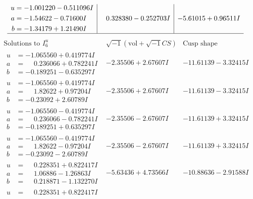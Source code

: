 \documentclass[1p]{elsarticle_modified}
\theoremstyle{definition}
\newcommand{\I}{\sqrt{-1}}
\begin{document}
$$\begin{array}{c|c|c}
\begin{aligned}
u &= -1.001220 - 0.511096 I \\
a &= -1.54622 - 0.71600 I \\
b &= -1.34179 + 1.21490 I\end{aligned}
 & \phantom{-}0.328380 - 0.252703 I & -5.61015 + 0.96511 I\\
 \hline 
 \end{array}$$\newpage$$\begin{array}{c|c|c}  
\text{Solutions to }I^u_{6}& \I (\text{vol} + \sqrt{-1}CS) & \text{Cusp shape}\\
 \hline 
\begin{aligned}
u &= -1.065560 + 0.419774 I \\
a &= \phantom{-}0.236066 + 0.782241 I \\
b &= -0.189251 - 0.635297 I\end{aligned}
 & -2.35506 + 2.67607 I & -11.61139 - 3.32415 I \\ \hline\begin{aligned}
u &= -1.065560 + 0.419774 I \\
a &= \phantom{-}1.82622 + 0.97204 I \\
b &= -0.23092 + 2.60789 I\end{aligned}
 & -2.35506 + 2.67607 I & -11.61139 - 3.32415 I \\ \hline\begin{aligned}
u &= -1.065560 - 0.419774 I \\
a &= \phantom{-}0.236066 - 0.782241 I \\
b &= -0.189251 + 0.635297 I\end{aligned}
 & -2.35506 - 2.67607 I & -11.61139 + 3.32415 I \\ \hline\begin{aligned}
u &= -1.065560 - 0.419774 I \\
a &= \phantom{-}1.82622 - 0.97204 I \\
b &= -0.23092 - 2.60789 I\end{aligned}
 & -2.35506 - 2.67607 I & -11.61139 + 3.32415 I \\ \hline\begin{aligned}
u &= \phantom{-}0.228351 + 0.822417 I \\
a &= \phantom{-}1.06886 - 1.26863 I \\
b &= \phantom{-}0.218871 - 1.132270 I\end{aligned}
 & -5.63436 + 4.73566 I & -10.88636 - 2.91588 I \\ \hline\begin{aligned}
u &= \phantom{-}0.228351 + 0.822417 I \\

\end{aligned}
\end{array}$$
\end{document}
